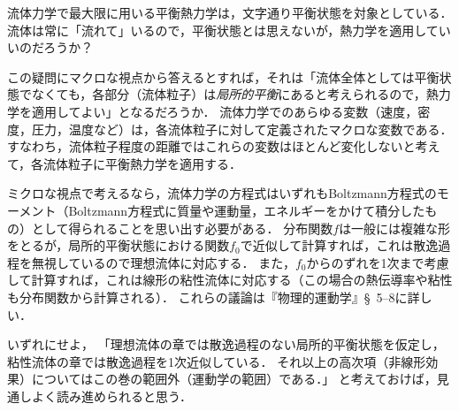 \begin{details}
流体力学で最大限に用いる平衡熱力学は，文字通り平衡状態を対象としている．
流体は常に「流れて」いるので，平衡状態とは思えないが，熱力学を適用していいのだろうか？


この疑問にマクロな視点から答えるとすれば，それは「流体全体としては平衡状態でなくても，各部分（流体粒子）は\emph{局所的平衡}にあると考えられるので，熱力学を適用してよい」となるだろうか．
流体力学でのあらゆる変数（速度，密度，圧力，温度など）は，各流体粒子に対して定義されたマクロな変数である．
すなわち，流体粒子程度の距離ではこれらの変数はほとんど変化しないと考えて，各流体粒子に平衡熱力学を適用する．



ミクロな視点で考えるなら，流体力学の方程式はいずれもBoltzmann方程式のモーメント（Boltzmann方程式に質量や運動量，エネルギーをかけて積分したもの）として得られることを思い出す必要がある．
分布関数$f$は一般には複雑な形をとるが，局所的平衡状態における関数$f_0$で近似して計算すれば，これは散逸過程を無視しているので理想流体に対応する．
また，$f_0$からのずれを1次まで考慮して計算すれば，これは線形の粘性流体に対応する（この場合の熱伝導率や粘性も分布関数から計算される）．
これらの議論は『物理的運動学』\S~5--8に詳しい．


いずれにせよ，
「理想流体の章では散逸過程のない局所的平衡状態を仮定し，粘性流体の章では散逸過程を1次近似している．
それ以上の高次項（非線形効果）についてはこの巻の範囲外（運動学の範囲）である．」
と考えておけば，見通しよく読み進められると思う．



\end{details}


